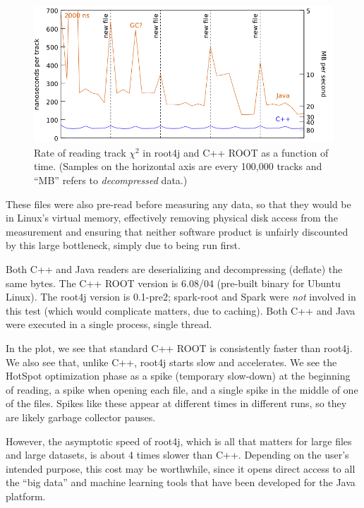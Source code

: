 \documentclass[12pt]{article}
\begin{document}
\begin{figure}[t]
\begin{center}
\includegraphics[width=0.8\linewidth]{root4j_reading_tracks.png}
\end{center}

\caption{\label{root4j_reading_tracks} Rate of reading track $\chi^2$ in root4j and C++ ROOT as a function of time. (Samples on the horizontal axis are every 100,000 tracks and ``MB'' refers to {\it decompressed} data.)}
\end{figure}

These files were also pre-read before measuring any data, so that they would be in Linux's virtual memory, effectively removing physical disk access from the measurement and ensuring that neither software product is unfairly discounted by this large bottleneck, simply due to being run first.

Both C++ and Java readers are deserializing and decompressing (deflate) the same bytes. The C++ ROOT version is 6.08/04 (pre-built binary for Ubuntu Linux). The root4j version is 0.1-pre2; spark-root and Spark were {\it not} involved in this test (which would complicate matters, due to caching). Both C++ and Java were executed in a single process, single thread.

In the plot, we see that standard C++ ROOT is consistently faster than root4j. We also see that, unlike C++, root4j starts slow and accelerates. We see the HotSpot optimization phase as a spike (temporary slow-down) at the beginning of reading, a spike when opening each file, and a single spike in the middle of one of the files. Spikes like these appear at different times in different runs, so they are likely garbage collector pauses.

However, the asymptotic speed of root4j, which is all that matters for large files and large datasets, is about 4 times slower than C++. Depending on the user's intended purpose, this cost may be worthwhile, since it opens direct access to all the ``big data'' and machine learning tools that have been developed for the Java platform.
\end{document}

